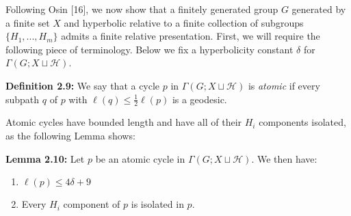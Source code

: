 \documentclass[12pt]{article}
\newcommand{\vs}{\vskip10pt}
\begin{document}
	\vs 
	
	Following Osin [16], we now show that a finitely generated group $G$ generated by a finite set $X$ and hyperbolic relative to a finite collection of subgroups $\{H_1,...,H_m\}$ admits a finite relative presentation. First, we will require the following piece of terminology. Below we fix a hyperbolicity constant $\delta$ for $\Gamma(G; X \sqcup \mathcal{H})$. 
	
	\vs
	
	\textbf{Definition 2.9: } We say that a cycle $p$ in $\Gamma(G; X \sqcup \mathcal{H})$ is \textit{atomic} if every subpath $q$ of $p$ with $\ell(q) \leq \frac{1}{2} \ell(p)$ is a geodesic. 
	
	\vs
	
	Atomic cycles have bounded length and have all of their $H_i$ components isolated, as the following Lemma shows: 
	
	\vs 
	
	\textbf{Lemma 2.10: } Let $p$ be an atomic cycle in $\Gamma(G; X \sqcup \mathcal{H})$. We then have: 
	
	\begin{enumerate}[label = (\roman*)]
		\item $\ell(p) \leq 4 \delta + 9$
		\item Every $H_i$ component of $p$ is isolated in $p$. 
	\end{enumerate}
\end{document}

